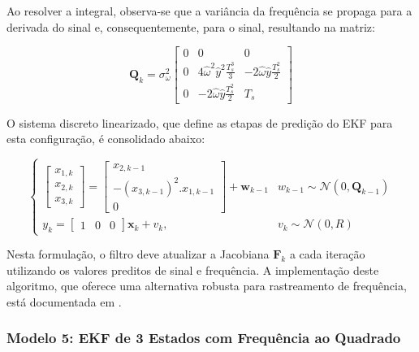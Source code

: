 \documentclass[a4paper,12pt]{article}
\begin{document}
Ao resolver a integral, observa-se que a variância da frequência se propaga para a derivada do sinal e, consequentemente, para o sinal, resultando na matriz:

\begin{equation}
    \mathbf{Q}_k = \sigma_{\omega}^2 \begin{bmatrix} 
        0 & 0 & 0 \\ 
        0 & 4\hat{\omega}^2 \hat{y}^2 \frac{T_s^3}{3} & -2\hat{\omega} \hat{y} \frac{T_s^2}{2} \\ 
        0 & -2\hat{\omega} \hat{y} \frac{T_s^2}{2} & T_s 
    \end{bmatrix}
    \label{eq:mod4_Qk_final}
\end{equation}


O sistema discreto linearizado, que define as etapas de predição do EKF para esta configuração, é consolidado abaixo:

\begin{equation}
    \begin{cases}
        \begin{bmatrix} x_{1,k} \\ x_{2,k} \\ x_{3,k}\end{bmatrix} = \begin{bmatrix} x_{2,k-1} \\ -(x_{3,k-1})^2. x_{1,k-1} \\ 0 \end{bmatrix} + \mathbf{w}_{k-1} & w_{k-1} \sim \mathcal{N}(0, \mathbf{Q}_{k-1}) \\ 
        y_k = \begin{bmatrix} 1 & 0 & 0 \end{bmatrix} \mathbf{x}_{k} + v_k, & v_k \sim \mathcal{N}(0, R)
    \end{cases}
    \label{eq:mod4_sistema_discreto_completo}
\end{equation}

Nesta formulação, o filtro deve atualizar a Jacobiana $\mathbf{F}_k$ a cada iteração utilizando os valores preditos de sinal e frequência. A implementação deste algoritmo, que oferece uma alternativa robusta para rastreamento de frequência, está documentada em .


\subsubsection{Modelo 5: EKF de 3 Estados com Frequência ao Quadrado}
\label{subsubsec:modelo5}
\end{document}
